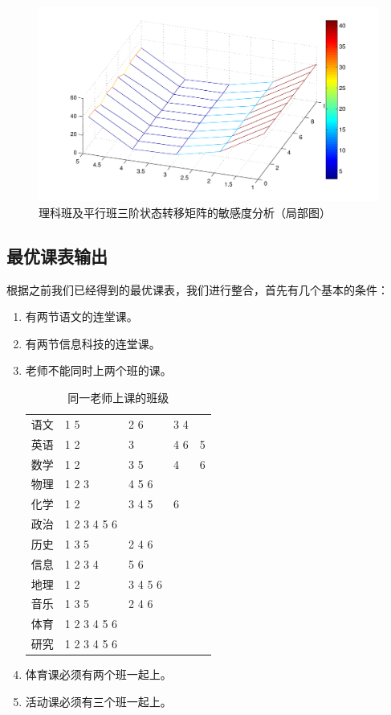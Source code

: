 \documentclass[a4paper]{article}
\begin{document}
  \begin{figure}[H]
  \centerline{\includegraphics[scale=0.7]{norm3part.pdf}}
  \caption{理科班及平行班三阶状态转移矩阵的敏感度分析（局部图）}
  \end{figure}

 \clearpage

 \subsection{最优课表输出}

  根据之前我们已经得到的最优课表，我们进行整合，首先有几个基本的条件：

  \begin{enumerate}

  \item 有两节语文的连堂课。

  \item 有两节信息科技的连堂课。

  \item 老师不能同时上两个班的课。

  \begin{table}[H]
  \centering
  \begin{tabular}{l|p{50pt}p{50pt}p{50pt}p{50pt}}
  \toprule
  语文 & 1 5 & 2 6 & 3 4 & \\
  英语 & 1 2 & 3 & 4 6 & 5 \\
  数学 & 1 2 & 3 5 & 4 & 6 \\
  物理 & 1 2 3 & 4 5 6 & & \\
  化学 & 1 2 & 3 4 5 & 6 & \\
  政治 & 1 2 3 4 5 6 & & & \\
  历史 & 1 3 5 & 2 4 6 & & \\
  信息 & 1 2 3 4 & 5 6 & & \\
  地理 & 1 2 & 3 4 5 6 & & \\
  音乐 & 1 3 5 & 2 4 6 & & \\
  体育 & 1 2 3 4 5 6 & & & \\
  研究 & 1 2 3 4 5 6 & & & \\
  \bottomrule
  \end{tabular}
  \caption{同一老师上课的班级}
  \end{table}

  \item 体育课必须有两个班一起上。

  \item 活动课必须有三个班一起上。

  \end{enumerate}
\end{document}
